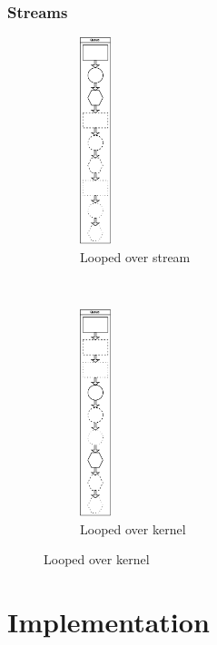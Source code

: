 \documentclass{beamer}
\begin{document}
\begin{frame}
\frametitle{Streams}

\begin{figure}
        \centering
        \begin{subfigure}[b]{0.48\textwidth}
        \centering
                \includegraphics[width=0.9cm]{../StreamsQueueStreamLoop.png}
                \caption*{Looped over stream}
        \end{subfigure}%
        ~
        \begin{subfigure}[b]{0.48\textwidth}
        \centering
                \includegraphics[width=0.9cm]{../StreamsQueueKernelLoop.png}
                \caption*{Looped over kernel}
        \end{subfigure}
\end{figure}

\end{frame}

\section{Implementation}


\end{document}
